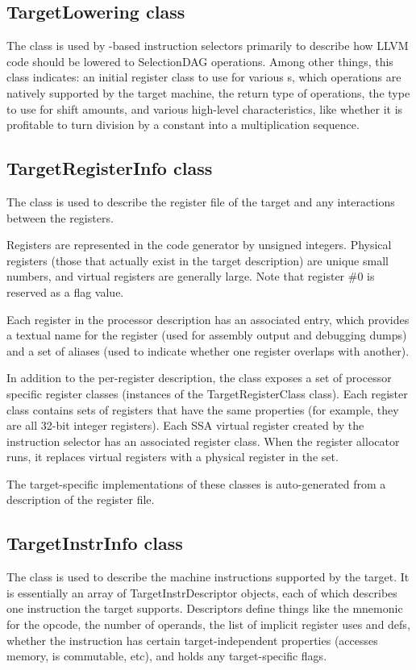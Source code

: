 \documentclass{myproc}
\begin{document}
\subsection{TargetLowering class}
The  class is used by -based instruction
selectors primarily to describe how LLVM code should be lowered to
SelectionDAG operations. Among other things, this class indicates: 
 \bit
 \w an initial register class to use for various s,
 \w which operations are natively supported by the target machine,
 \w the return type of  operations,
 \w the type to use for shift amounts, and
 \w various high-level characteristics, like whether it is profitable to turn
 division by a constant into a multiplication sequence.
 \eit

\subsection{TargetRegisterInfo class}
The  class is used to describe the register file of the
target and any interactions between the registers. 

Registers are represented in the code generator by unsigned integers. Physical registers (those that actually exist in the target description) are unique small numbers, and virtual registers are generally large. Note that register \#0 is reserved as a flag value.

Each register in the processor description has an associated
 entry, which provides a textual name for the register
(used for assembly output and debugging dumps) and a set of aliases (used to
indicate whether one register overlaps with another). 

In addition to the per-register description, the  class
exposes a set of processor specific register classes (instances of the
TargetRegisterClass class). Each register class contains sets of registers
that have the same properties (for example, they are all 32-bit integer
registers). Each SSA virtual register created by the instruction selector has
an associated register class. When the register allocator runs, it replaces
virtual registers with a physical register in the set. 

The target-specific implementations of these classes is auto-generated from a  description of the register file.

\subsection{TargetInstrInfo class}
The  class is used to describe the machine instructions
supported by the target. It is essentially an array of TargetInstrDescriptor
objects, each of which describes one instruction the target
supports. Descriptors define things like the mnemonic for the opcode, the
number of operands, the list of implicit register uses and defs, whether the
instruction has certain target-independent properties (accesses memory, is
commutable, etc), and holds any target-specific flags. 
\end{document}
